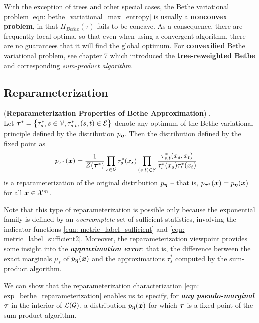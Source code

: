 \documentclass[11pt]{article}
\begin{document}
With the exception of trees and other special cases, the Bethe variational problem \eqref{eqn: bethe_variational_max_entropy} is usually a \textbf{nonconvex problem}, in that $H_{Bethe}(\tau)$ fails to be concave. As a consequence, there are frequently local optima, so that even when using a convergent algorithm, there are no guarantees that it will find the global optimum. For \textbf{convexified} Bethe variational problem, see \citep{wainwright2008graphical} chapter 7 which introduced the \textbf{tree-reweighted Bethe} and corresponding \emph{sum-product algorithm}.

\subsection{Reparameterization}
\begin{proposition} (\textbf{Reparameterization Properties of Bethe Approximation})  \citep{wainwright2008graphical}. \\
Let $\boldsymbol{\tau}^{*} = \left\{\tau^{*}_{s}, s\in {\mathcal V}, \tau^{*}_{s,t}, (s,t) \in {\mathcal E}\right\}$ denote any optimum of the Bethe variational principle defined by the distribution $p_{\boldsymbol{\eta}}$.
Then the distribution defined by the fixed point as
\begin{align}
p_{\boldsymbol{\tau}^{*}}(\boldsymbol{x}) &= \frac{1}{Z(\boldsymbol{\tau}^{*})}\prod_{s\in {\mathcal V}}\tau^{*}_{s}(x_s)\prod_{(s,t) \in {\mathcal E}}\frac{\tau^{*}_{s,t}(x_s, x_t)}{\tau^{*}_{s}(x_s)\tau^{*}_{t}(x_t)} \label{eqn: exp_bethe_reparameterization}
\end{align} is a reparameterization of the original distribution $p_{\boldsymbol{\eta}}$ -- that is, $p_{\boldsymbol{\tau}^{*}}(\boldsymbol{x}) = p_{\boldsymbol{\eta}}(\boldsymbol{x})$ for all $\boldsymbol{x} \in {\mathcal X}^m$.
\end{proposition} 

Note that this type of reparameterization is possible only because the exponential family is defined by an \emph{overcomplete} set of sufficient statistics, involving the indicator functions \eqref{eqn: metric_label_sufficient} and \eqref{eqn: metric_label_sufficient2}. Moreover, the reparameterization viewpoint provides some
insight into the \textbf{\emph{approximation error}}: that is, the difference between the exact marginals $\mu_s$ of $p_{\boldsymbol{\eta}}(\boldsymbol{x})$ and the approximations  $\tau_s^{*}$ computed by the sum-product algorithm.

We can show that  the reparameterization characterization \eqref{eqn: exp_bethe_reparameterization} enables us to specify, for \emph{\textbf{any pseudo-marginal}} $\boldsymbol{\tau}$ in the interior of ${\mathcal L}({\mathcal G})$, a distribution $p_{\boldsymbol{\eta}}(\boldsymbol{x})$ for which $\boldsymbol{\tau}$ is a fixed point of the sum-product algorithm.
\end{document}
